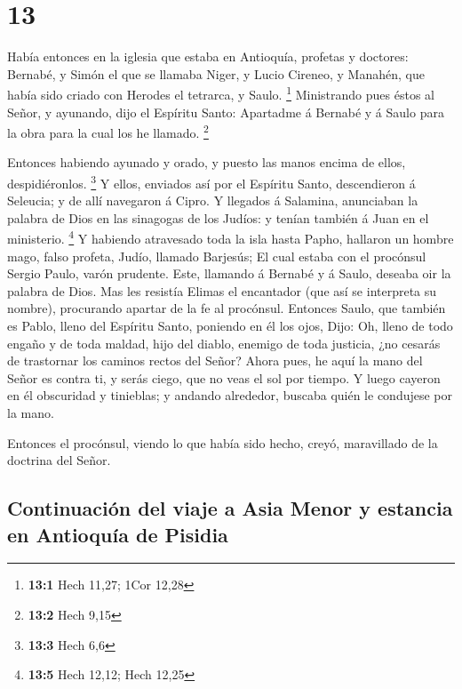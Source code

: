 \hypertarget{section-12}{%
\section{13}\label{section-12}}

 Había entonces en la iglesia que estaba en Antioquía,
profetas y doctores: Bernabé, y Simón el que se llamaba Niger, y Lucio
Cireneo, y Manahén, que había sido criado con Herodes el tetrarca, y
Saulo. \footnote{\textbf{13:1} Hech 11,27; 1Cor 12,28} 
Ministrando pues éstos al Señor, y ayunando, dijo el Espíritu Santo:
Apartadme á Bernabé y á Saulo para la obra para la cual los he llamado.
\footnote{\textbf{13:2} Hech 9,15}

 Entonces habiendo ayunado y orado, y puesto las manos
encima de ellos, despidiéronlos. \footnote{\textbf{13:3} Hech 6,6}
 Y ellos, enviados así por el Espíritu Santo, descendieron
á Seleucia; y de allí navegaron á Cipro.  Y llegados á
Salamina, anunciaban la palabra de Dios en las sinagogas de los Judíos:
y tenían también á Juan en el ministerio. \footnote{\textbf{13:5} Hech
  12,12; Hech 12,25}  Y habiendo atravesado toda la isla
hasta Papho, hallaron un hombre mago, falso profeta, Judío, llamado
Barjesús;  El cual estaba con el procónsul Sergio Paulo,
varón prudente. Este, llamando á Bernabé y á Saulo, deseaba oir la
palabra de Dios.  Mas les resistía Elimas el encantador
(que así se interpreta su nombre), procurando apartar de la fe al
procónsul.  Entonces Saulo, que también es Pablo, lleno
del Espíritu Santo, poniendo en él los ojos,  Dijo: Oh,
lleno de todo engaño y de toda maldad, hijo del diablo, enemigo de toda
justicia, ¿no cesarás de trastornar los caminos rectos del Señor?
 Ahora pues, he aquí la mano del Señor es contra ti, y
serás ciego, que no veas el sol por tiempo. Y luego cayeron en él
obscuridad y tinieblas; y andando alrededor, buscaba quién le condujese
por la mano.

 Entonces el procónsul, viendo lo que había sido hecho,
creyó, maravillado de la doctrina del Señor.

\hypertarget{continuaciuxf3n-del-viaje-a-asia-menor-y-estancia-en-antioquuxeda-de-pisidia}{%
\subsection{Continuación del viaje a Asia Menor y estancia en Antioquía
de
Pisidia}\label{continuaciuxf3n-del-viaje-a-asia-menor-y-estancia-en-antioquuxeda-de-pisidia}}

